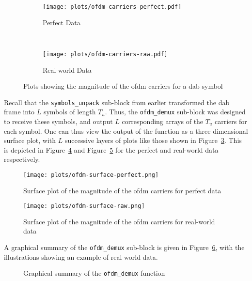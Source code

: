 \documentclass[class=report,11pt,crop=false]{standalone}
\begin{document}
\begin{figure}[htbp]
  \centering
  \captionsetup{type=figure}
  \begin{subfigure}[t]{0.45\textwidth}
    \centering
    \captionsetup{type=figure}
    \texttt{[image: plots/ofdm-carriers-perfect.pdf]}
    \caption{Perfect Data}
    \label{fig:ofdm-carriers-perfect}
  \end{subfigure}%
  ~ 
  \begin{subfigure}[t]{0.45\textwidth}
    \centering
    \captionsetup{type=figure}
    \texttt{[image: plots/ofdm-carriers-raw.pdf]}
    \caption{Real-world Data}
    \label{fig:ofdm-carriers-raw}
  \end{subfigure}
  \caption{Plots showing the magnitude of the \gls{ofdm} carriers for a \gls{dab} symbol}
  \label{fig:ofdm-carriers}
\end{figure}

Recall that the \texttt{symbols\_unpack} sub-block from earlier transformed the \gls{dab} frame into \(L\) symbols of length \(T_u\). Thus, the \texttt{ofdm\_demux} sub-block was designed to receive these symbols, and output \(L\) corresponding arrays of the \(T_u\) carriers for each symbol. One can thus view the output of the function as a three-dimensional surface plot, with \(L\) successive layers of plots like those shown in Figure~\ref{fig:ofdm-carriers}. This is depicted in Figure~\ref{fig:ofdm-surface-perfect} and Figure~\ref{fig:ofdm-surface-raw} for the perfect and real-world data respectively.

\begin{figure}[htbp]
  \centering
  \captionsetup{type=figure}
  \texttt{[image: plots/ofdm-surface-perfect.png]}
  \caption{Surface plot of the magnitude of the \gls{ofdm} carriers for perfect data}
  \label{fig:ofdm-surface-perfect}
\end{figure}

\begin{figure}[htbp]
  \centering
  \captionsetup{type=figure}
  \texttt{[image: plots/ofdm-surface-raw.png]}
  \caption{Surface plot of the magnitude of the \gls{ofdm} carriers for real-world data}
  \label{fig:ofdm-surface-raw}
\end{figure}

A graphical summary of the \texttt{ofdm\_demux} sub-block is given in Figure~\ref{fig:ofdm_demux}, with the illustrations showing an example of real-world data.

\begin{figure}[htbp]
  \centering
  \captionsetup{type=figure}
  \def\svgwidth{\linewidth}
  { %
      }
  \caption{Graphical summary of the \texttt{ofdm\_demux} function}
  \label{fig:ofdm_demux}
\end{figure}
\end{document}

